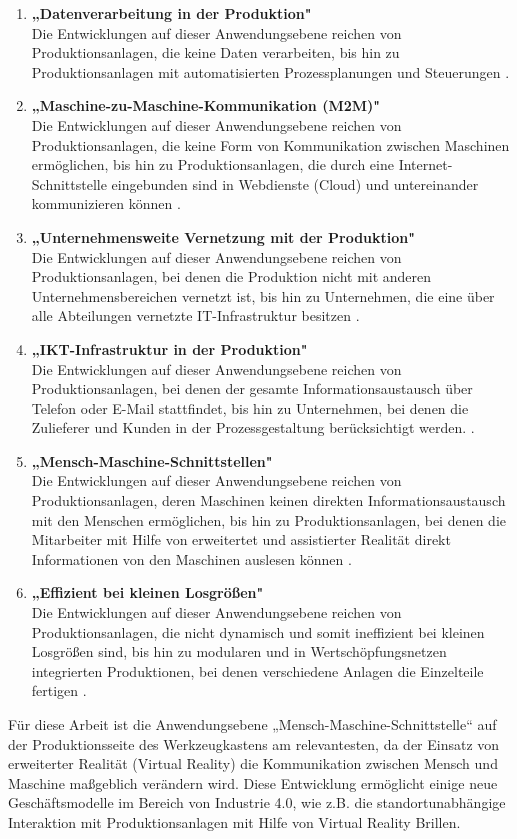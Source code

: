\begin{enumerate}
	\item \textbf{„Datenverarbeitung in der Produktion"} \cite[S.15]{2} \\ Die Entwicklungen auf dieser Anwendungsebene reichen von Produktionsanlagen, die keine Daten verarbeiten, bis hin zu Produktionsanlagen mit automatisierten Prozessplanungen und Steuerungen \cite[S.15]{2}.
	\item \textbf{„Maschine-zu-Maschine-Kommunikation (M2M)"} \cite[S.15]{2} \\ Die Entwicklungen auf dieser Anwendungsebene reichen von Produktionsanlagen, die keine Form von Kommunikation zwischen Maschinen ermöglichen, bis hin zu Produktionsanlagen, die durch eine Internet-Schnittstelle eingebunden sind in Webdienste (Cloud) und untereinander kommunizieren können \cite[S.15]{2}.
	\item \textbf{„Unternehmensweite Vernetzung mit der Produktion"} \cite[S.15]{2} \\ Die Entwicklungen auf dieser Anwendungsebene reichen von Produktionsanlagen, bei denen die Produktion nicht mit anderen Unternehmensbereichen vernetzt ist, bis hin zu Unternehmen, die eine über alle Abteilungen vernetzte IT-Infrastruktur besitzen \cite[S.15]{2}.
	\item \textbf{„IKT-Infrastruktur in der Produktion"} \cite[S.15]{2} \\ Die Entwicklungen auf dieser Anwendungsebene reichen von Produktionsanlagen, bei denen der gesamte Informationsaustausch über Telefon oder E-Mail stattfindet, bis hin zu Unternehmen, bei denen die Zulieferer und Kunden in der Prozessgestaltung berücksichtigt werden. \cite[S.15]{2}.
	\item \textbf{„Mensch-Maschine-Schnittstellen"} \cite[S.15]{2} \\ Die Entwicklungen auf dieser Anwendungsebene reichen von Produktionsanlagen, deren Maschinen keinen direkten Informationsaustausch mit den Menschen ermöglichen, bis hin zu Produktionsanlagen, bei denen die Mitarbeiter mit Hilfe von erweitertet und assistierter Realität direkt Informationen von den Maschinen auslesen können \cite[S.15]{2}.
	\item \textbf{„Effizient bei kleinen Losgrößen"} \cite[S.15]{2} \\ Die Entwicklungen auf dieser Anwendungsebene reichen von Produktionsanlagen, die nicht dynamisch und somit ineffizient bei kleinen Losgrößen sind, bis hin zu modularen und in Wertschöpfungsnetzen integrierten Produktionen, bei denen verschiedene Anlagen die Einzelteile fertigen \cite[S.15]{2}.
\end{enumerate}
Für diese Arbeit ist die Anwendungsebene „Mensch-Maschine-Schnittstelle“ auf der Produktionsseite des Werkzeugkastens am relevantesten, da der Einsatz von erweiterter Realität (Virtual Reality) die Kommunikation zwischen Mensch und Maschine maßgeblich verändern wird. Diese Entwicklung ermöglicht einige neue Geschäftsmodelle im Bereich von Industrie 4.0, wie z.B. die standortunabhängige Interaktion mit Produktionsanlagen mit Hilfe von Virtual Reality Brillen.

